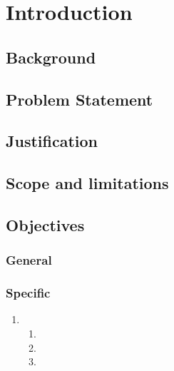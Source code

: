 \chapter{Introduction}
\label{cha:introduction}



\section{Background}


\section{Problem Statement} 


\section{Justification}


\section{Scope and limitations}


\section{Objectives}
\subsection {General}
 
 
\subsection {Specific}

\begin{enumerate}
\item 
\begin{enumerate}
    \item 
    \item   
    \item  
\end{enumerate}
	

\end{enumerate}




